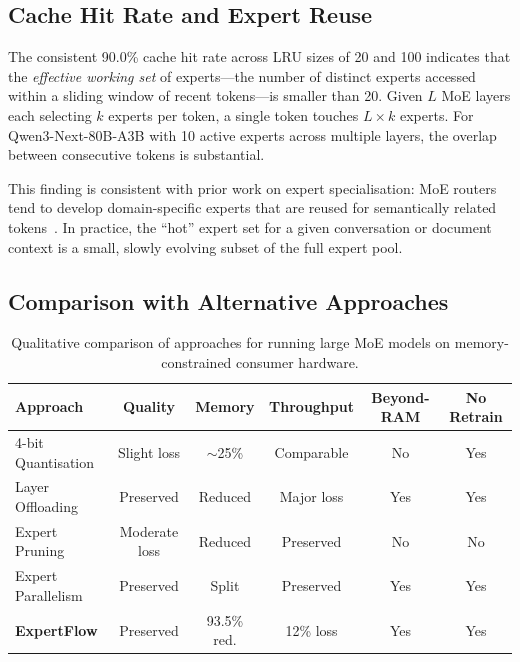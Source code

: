 \documentclass[11pt,a4paper]{article}
\begin{document}
\subsection{Cache Hit Rate and Expert Reuse}
\label{sec:analysis:cache}

The consistent 90.0\% cache hit rate across LRU sizes of 20 and 100 indicates
that the \emph{effective working set} of experts---the number of distinct
experts accessed within a sliding window of recent tokens---is smaller than 20.
Given $L$ MoE layers each selecting $k$ experts per token, a single token
touches $L \times k$ experts. For Qwen3-Next-80B-A3B with 10 active experts
across multiple layers, the overlap between consecutive tokens is substantial.

This finding is consistent with prior work on expert specialisation: MoE
routers tend to develop domain-specific experts that are reused for
semantically related tokens~\citep{fedus2022switch, zoph2022stmoe}. In
practice, the ``hot'' expert set for a given conversation or document context
is a small, slowly evolving subset of the full expert pool.

\subsection{Comparison with Alternative Approaches}
\label{sec:analysis:comparison}

\begin{table}[t]
\centering
\caption{Qualitative comparison of approaches for running large MoE models on
  memory-constrained consumer hardware.}
\label{tab:comparison}
\begin{tabular}{lccccc}
\toprule
\textbf{Approach} & \textbf{Quality} & \textbf{Memory} &
  \textbf{Throughput} & \textbf{Beyond-RAM} & \textbf{No Retrain} \\
\midrule
4-bit Quantisation   & Slight loss & $\sim$25\% & Comparable & No  & Yes \\
Layer Offloading     & Preserved   & Reduced    & Major loss & Yes & Yes \\
Expert Pruning       & Moderate loss & Reduced  & Preserved  & No  & No  \\
Expert Parallelism   & Preserved   & Split      & Preserved  & Yes & Yes \\
\textbf{ExpertFlow}  & Preserved   & 93.5\% red.& 12\% loss  & Yes & Yes \\
\bottomrule
\end{tabular}
\end{table}
\end{document}
